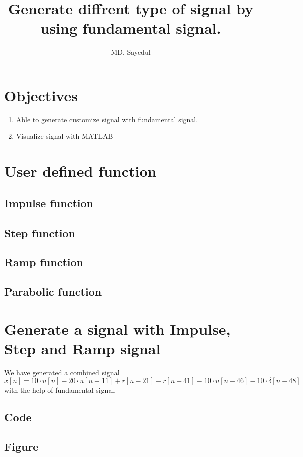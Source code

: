 \documentclass[14pt, letterpaper]{article}
\title{Generate diffrent type of signal by using fundamental signal.}
\author{MD. Sayedul}
\begin{document}

\tableofcontents
\newpage
\section{Objectives}
\begin{enumerate}
    \item Able to generate customize signal with fundamental signal.
    \item Visualize signal with MATLAB
\end{enumerate}

\section{User defined function}
\subsection{Impulse function}

\subsection{Step function}

\subsection{Ramp function}

\subsection{Parabolic function}

\section{Generate a signal with Impulse, Step and Ramp signal}
We have generated a combined signal $$x[n]=10\cdot u[n]-20\cdot u[n-11]+r[n-21]-r[n-41]-10\cdot u[n-46]-10\cdot \delta[n-48]$$ with the help of fundamental signal.
\subsection{Code}

\subsection{Figure}
\end{document}
